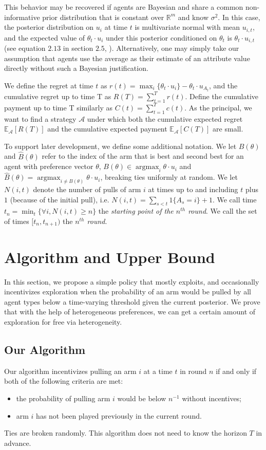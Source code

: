 \documentclass{article}
\newcommand{\argmax}{\mathop{\mathrm{argmax}}}
\begin{document}
This behavior may be recovered if agents are Bayesian and share a common non-informative prior distribution that is constant over $\mathbb{R}^m$ and know $\sigma^2$.  In this case, the posterior distribution on $u_{i}$ at time $t$ is multivariate normal with mean $u_{i,t}$, and the expected value of $\theta_t \cdot u_i$ under this posterior conditioned on $\theta_t$ is $\theta_t \cdot u_{i,t}$ (see equation $2.13$ in section $2.5$, \cite{Ge04}).  Alternatively, one may simply take our assumption that agents use the average as their estimate of an attribute value directly without such a Bayesian justification.

We define the regret at time $t$ as $r(t)=\max_{i}\{\theta_{t}\cdot u_{i}\}-\theta_t\cdot u_{A_t}$, and the cumulative regret up to time T as $R(T)=\sum_{t=1}^{T}r(t)$. Define the cumulative payment up to time T similarly as $C(t)=\sum_{t=1}^{T}c(t)$. 
As the principal, we want to find a strategy $\mathcal{A}$ under which both the cumulative expected regret $\mathbb{E}_{\mathcal{A}}[R(T)]$ and the cumulative expected payment $\mathbb{E}_{\mathcal{A}}[C(T)]$ are small.

To support later development, we define some additional notation.
We let $B(\theta)$ and $\hat{B}(\theta)$ refer to the index of the arm that is best and second best for an agent with preference vector $\theta$, $B(\theta) \in \argmax_i \theta \cdot u_i$ and $\hat{B}(\theta)=\argmax_{i\neq B(\theta)}\theta\cdot u_{i}$, breaking ties uniformly at random. We let $N(i,t)$ denote the number of pulls of arm $i$ at times up to and including $t$ plus $1$ (because of the initial pull), i.e. $N(i,t)=\sum_{s<t} 1\{A_s = i\}+1$.
We call time $t_{n}=\min_{t}\{\forall i, N(i,t)\geq n\}$ the {\it starting point of the $n^{th}$ round}. We call the set of times $[t_{n}, t_{n+1})$ the {\it $n^{th}$ round}.


\section{Algorithm and Upper Bound}
\label{sec:ub}

In this section, we propose a simple policy that mostly exploits, and occasionally incentivizes exploration when the probability of an arm would be pulled by all agent types below a time-varying threshold given the current posterior. We prove that with the help of heterogeneous preferences, we can get a certain amount of exploration for free via heterogeneity. 

\subsection{Our Algorithm}
Our algorithm incentivizes pulling an arm $i$ at a time $t$ in round $n$ if and only if both of the following criteria are met:
\begin{itemize}
\item the probability of pulling arm $i$ would be below $n^{-1}$ without incentives; 
\item arm $i$ has not been played previously in the current round.
\end{itemize}
Ties are broken randomly.  This algorithm does not need to know the horizon $T$ in advance. 
\end{document}
